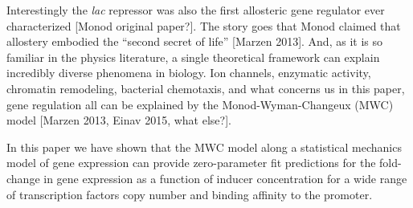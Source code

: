 Interestingly the \textit{lac} repressor was also the first allosteric gene regulator ever characterized [Monod original paper?]. The story goes that Monod claimed that allostery embodied the ``second secret of life'' [Marzen 2013]. And, as it is so familiar in the physics literature, a single theoretical framework can explain incredibly diverse phenomena in biology. Ion channels, enzymatic activity, chromatin remodeling, bacterial chemotaxis, and what concerns us in this paper, gene regulation all can be explained by the Monod-Wyman-Changeux (MWC) model [Marzen 2013, Einav 2015, what else?].

In this paper we have shown that the MWC model along a statistical mechanics model of gene expression can provide zero-parameter fit predictions for the fold-change in gene expression as a function of inducer concentration for a wide range of transcription factors copy number and binding affinity to the promoter.

